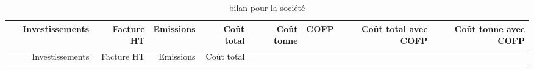 \documentclass[]{article}
\begin{document}
\begin{longtable}[]{@{}crrrrrrrr@{}}
\caption{bilan pour la société}\tabularnewline
\toprule
\begin{minipage}[b]{0.08\columnwidth}\centering\strut
~\strut
\end{minipage} & \begin{minipage}[b]{0.09\columnwidth}\raggedleft\strut
Investissements\strut
\end{minipage} & \begin{minipage}[b]{0.06\columnwidth}\raggedleft\strut
Facture HT\strut
\end{minipage} & \begin{minipage}[b]{0.06\columnwidth}\raggedleft\strut
Emissions\strut
\end{minipage} & \begin{minipage}[b]{0.07\columnwidth}\raggedleft\strut
Coût total\strut
\end{minipage} & \begin{minipage}[b]{0.07\columnwidth}\raggedleft\strut
Coût tonne\strut
\end{minipage} & \begin{minipage}[b]{0.05\columnwidth}\raggedleft\strut
COFP\strut
\end{minipage} & \begin{minipage}[b]{0.13\columnwidth}\raggedleft\strut
Coût total avec COFP\strut
\end{minipage} & \begin{minipage}[b]{0.13\columnwidth}\raggedleft\strut
Coût tonne avec COFP\strut
\end{minipage}\tabularnewline
\midrule
\endfirsthead
\toprule
\begin{minipage}[b]{0.08\columnwidth}\centering\strut
~\strut
\end{minipage} & \begin{minipage}[b]{0.09\columnwidth}\raggedleft\strut
Investissements\strut
\end{minipage} & \begin{minipage}[b]{0.06\columnwidth}\raggedleft\strut
Facture HT\strut
\end{minipage} & \begin{minipage}[b]{0.06\columnwidth}\raggedleft\strut
Emissions\strut
\end{minipage} & \begin{minipage}[b]{0.07\columnwidth}\raggedleft\strut
Coût total\strut
\end{minipage} & \begin{minipage}[b]{0.07\columnwidth}\raggedleft\strut

\end{minipage}
\end{longtable}
\end{document}

